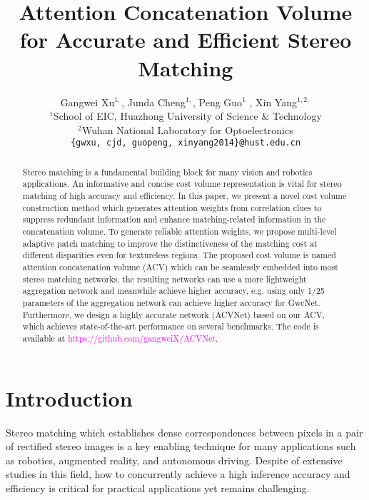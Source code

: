 \documentclass[10pt,twocolumn,letterpaper]{article}
\begin{document}
\title{Attention Concatenation Volume for Accurate and Efficient Stereo Matching}

\author{
Gangwei Xu$^{1,}$\footnotemark[1] ,  Junda Cheng$^{1,}$\footnotemark[1] ,  Peng Guo$^{1}$ ,  Xin Yang$^{1,2,}$\footnotemark[2]\\
$^{1}$School of EIC, Huazhong University of Science \& Technology\\
$^{2}$Wuhan National Laboratory for Optoelectronics\\
{\tt\small \{gwxu, cjd, guopeng, xinyang2014\}@hust.edu.cn}
}



\maketitle

\begin{abstract}
Stereo matching is a fundamental building block for many vision and robotics applications. An informative and concise cost volume representation is vital for stereo matching of high accuracy and efficiency.
In this paper, we present a novel cost volume construction method which generates attention weights from correlation clues to suppress redundant information and enhance matching-related information in the concatenation volume. To generate reliable attention weights, we propose multi-level adaptive patch matching to improve the distinctiveness of the matching cost at different disparities even for textureless regions. The proposed cost volume is named attention concatenation volume (ACV) which can be seamlessly embedded into most stereo matching networks, the resulting networks can use a more lightweight aggregation network and meanwhile achieve higher accuracy, e.g. using only 1/25 parameters of the aggregation network can achieve higher accuracy for GwcNet. Furthermore, we design a highly accurate network (ACVNet) based on our ACV, which
achieves state-of-the-art performance
on several benchmarks. 
The code is available at \textcolor{magenta}{https://github.com/gangweiX/ACVNet}.
\end{abstract}
{
\renewcommand{\thefootnote}{\fnsymbol{footnote}}
}

\section{Introduction}
\label{sec:intro}
Stereo matching which establishes dense correspondences between pixels in a pair of rectified stereo images is a key enabling technique for many applications such as robotics, augmented reality, and autonomous driving. Despite of extensive studies in this field, 
how to concurrently achieve a high inference accuracy and efficiency is critical for practical applications yet remains challenging.
\end{document}

